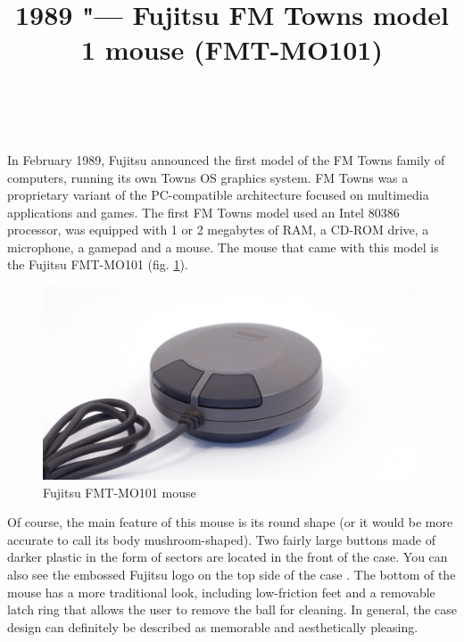 \documentclass[11pt, a4paper]{article}
\begin{document}
\title{1989 "--- Fujitsu FM Towns model 1 mouse (FMT-MO101)}
\date{}
\author{~}
\maketitle
{}

In February 1989, Fujitsu announced the first model of the FM Towns family of computers, running its own Towns OS graphics system. FM Towns was a proprietary variant of the PC-compatible architecture focused on multimedia applications and games. The first FM Towns model used an Intel 80386 processor, was equipped with 1 or 2 megabytes of RAM, a CD-ROM drive, a microphone, a gamepad and a mouse. The mouse that came with this model is the Fujitsu FMT-MO101 (fig. \ref{fig:FMT1Pic}).

\begin{figure}[h]
   \centering
    \includegraphics[scale=0.6]{1989_fujitsu_fmt_mo101_mouse/pic_30.jpg}
    \caption{Fujitsu FMT-MO101 mouse}
    \label{fig:FMT1Pic}
\end{figure}

Of course, the main feature of this mouse is its round shape (or it would be more accurate to call its body mushroom-shaped). Two fairly large buttons made of darker plastic in the form of sectors are located in the front of the case. You can also see the embossed Fujitsu logo on the top side of the case \cite{twinklemagic}. The bottom of the mouse has a more traditional look, including low-friction feet and a removable latch ring that allows the user to remove the ball for cleaning. In general, the case design can definitely be described as memorable and aesthetically pleasing.
\end{document}
